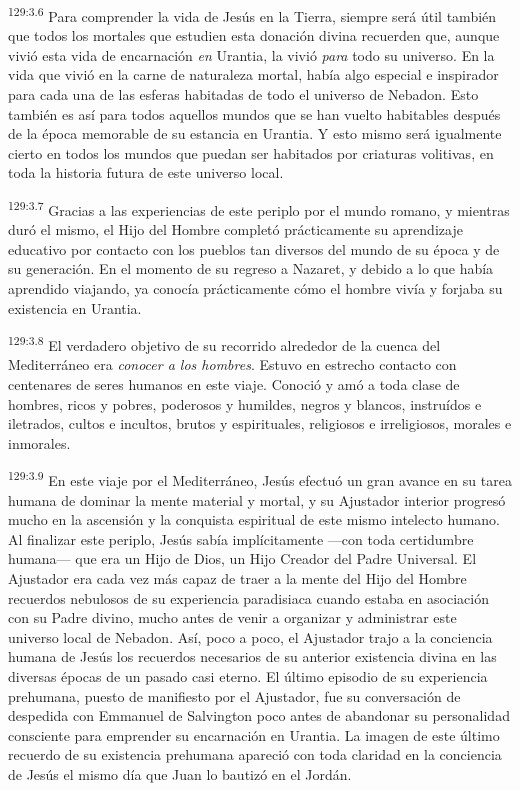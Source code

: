\par
\textsuperscript{129:3.6} Para comprender la vida de Jesús en la Tierra, siempre será útil también que todos los mortales que estudien esta donación divina recuerden que, aunque vivió esta vida de encarnación \textit{en} Urantia, la vivió \textit{para} todo su universo. En la vida que vivió en la carne de naturaleza mortal, había algo especial e inspirador para cada una de las esferas habitadas de todo el universo de Nebadon. Esto también es así para todos aquellos mundos que se han vuelto habitables después de la época memorable de su estancia en Urantia. Y esto mismo será igualmente cierto en todos los mundos que puedan ser habitados por criaturas volitivas, en toda la historia futura de este universo local.

\par
\textsuperscript{129:3.7} Gracias a las experiencias de este periplo por el mundo romano, y mientras duró el mismo, el Hijo del Hombre completó prácticamente su aprendizaje educativo por contacto con los pueblos tan diversos del mundo de su época y de su generación. En el momento de su regreso a Nazaret, y debido a lo que había aprendido viajando, ya conocía prácticamente cómo el hombre vivía y forjaba su existencia en Urantia.

\par
\textsuperscript{129:3.8} El verdadero objetivo de su recorrido alrededor de la cuenca del Mediterráneo era \textit{conocer a los hombres}. Estuvo en estrecho contacto con centenares de seres humanos en este viaje. Conoció y amó a toda clase de hombres, ricos y pobres, poderosos y humildes, negros y blancos, instruídos e iletrados, cultos e incultos, brutos y espirituales, religiosos e irreligiosos, morales e inmorales.

\par
\textsuperscript{129:3.9} En este viaje por el Mediterráneo, Jesús efectuó un gran avance en su tarea humana de dominar la mente material y mortal, y su Ajustador interior progresó mucho en la ascensión y la conquista espiritual de este mismo intelecto humano. Al finalizar este periplo, Jesús sabía implícitamente ---con toda certidumbre humana--- que era un Hijo de Dios, un Hijo Creador del Padre Universal. El Ajustador era cada vez más capaz de traer a la mente del Hijo del Hombre recuerdos nebulosos de su experiencia paradisiaca cuando estaba en asociación con su Padre divino, mucho antes de venir a organizar y administrar este universo local de Nebadon. Así, poco a poco, el Ajustador trajo a la conciencia humana de Jesús los recuerdos necesarios de su anterior existencia divina en las diversas épocas de un pasado casi eterno. El último episodio de su experiencia prehumana, puesto de manifiesto por el Ajustador, fue su conversación de despedida con Emmanuel de Salvington poco antes de abandonar su personalidad consciente para emprender su encarnación en Urantia. La imagen de este último recuerdo de su existencia prehumana apareció con toda claridad en la conciencia de Jesús el mismo día que Juan lo bautizó en el Jordán.

